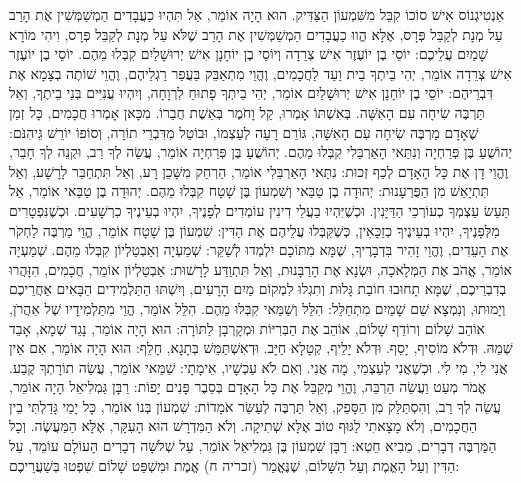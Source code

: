 אַנְטִיגְנוֹס אִישׁ סוֹכוֹ קִבֵּל מִשִּׁמְעוֹן הַצַּדִּיק. הוּא הָיָה אוֹמֵר, אַל תִּהְיוּ כַעֲבָדִים הַמְשַׁמְּשִׁין אֶת הָרַב עַל מְנָת לְקַבֵּל פְּרָס, אֶלָּא הֱווּ כַעֲבָדִים הַמְשַׁמְּשִׁין אֶת הָרַב שֶׁלֹּא עַל מְנָת לְקַבֵּל פְּרָס, וִיהִי מוֹרָא שָׁמַיִם עֲלֵיכֶם:
יוֹסֵי בֶן יוֹעֶזֶר אִישׁ צְרֵדָה וְיוֹסֵי בֶן יוֹחָנָן אִישׁ יְרוּשָׁלַיִם קִבְּלוּ מֵהֶם. יוֹסֵי בֶן יוֹעֶזֶר אִישׁ צְרֵדָה אוֹמֵר, יְהִי בֵיתְךָ בֵית וַעַד לַחֲכָמִים, וֶהֱוֵי מִתְאַבֵּק בַּעֲפַר רַגְלֵיהֶם, וֶהֱוֵי שׁוֹתֶה בְצָמָא אֶת דִּבְרֵיהֶם:
יוֹסֵי בֶן יוֹחָנָן אִישׁ יְרוּשָׁלַיִם אוֹמֵר, יְהִי בֵיתְךָ פָתוּחַ לִרְוָחָה, וְיִהְיוּ עֲנִיִּים בְּנֵי בֵיתֶךָ, וְאַל תַּרְבֶּה שִׂיחָה עִם הָאִשָּׁה. בְּאִשְׁתּוֹ אָמְרוּ, קַל וָחֹמֶר בְּאֵשֶׁת חֲבֵרוֹ. מִכָּאן אָמְרוּ חֲכָמִים, כָּל זְמַן שֶׁאָדָם מַרְבֶּה שִׂיחָה עִם הָאִשָּׁה, גּוֹרֵם רָעָה לְעַצְמוֹ, וּבוֹטֵל מִדִּבְרֵי תוֹרָה, וְסוֹפוֹ יוֹרֵשׁ גֵּיהִנֹּם:
יְהוֹשֻׁעַ בֶּן פְּרַחְיָה וְנִתַּאי הָאַרְבֵּלִי קִבְּלוּ מֵהֶם. יְהוֹשֻׁעַ בֶּן פְּרַחְיָה אוֹמֵר, עֲשֵׂה לְךָ רַב, וּקְנֵה לְךָ חָבֵר, וֶהֱוֵי דָן אֶת כָּל הָאָדָם לְכַף זְכוּת:
נִתַּאי הָאַרְבֵּלִי אוֹמֵר, הַרְחֵק מִשָּׁכֵן רָע, וְאַל תִּתְחַבֵּר לָרָשָׁע, וְאַל תִּתְיָאֵשׁ מִן הַפֻּרְעָנוּת:
יְהוּדָה בֶן טַבַּאי וְשִׁמְעוֹן בֶּן שָׁטָח קִבְּלוּ מֵהֶם. יְהוּדָה בֶן טַבַּאי אוֹמֵר, אַל תַּעַשׂ עַצְמְךָ כְעוֹרְכֵי הַדַּיָּנִין. וּכְשֶׁיִּהְיוּ בַעֲלֵי דִינִין עוֹמְדִים לְפָנֶיךָ, יִהְיוּ בְעֵינֶיךָ כִרְשָׁעִים. וּכְשֶׁנִּפְטָרִים מִלְּפָנֶיךָ, יִהְיוּ בְעֵינֶיךָ כְזַכָּאִין, כְּשֶׁקִּבְּלוּ עֲלֵיהֶם אֶת הַדִּין:
שִׁמְעוֹן בֶּן שָׁטָח אוֹמֵר, הֱוֵי מַרְבֶּה לַחְקֹר אֶת הָעֵדִים, וֶהֱוֵי זָהִיר בִּדְבָרֶיךָ, שֶׁמָּא מִתּוֹכָם יִלְמְדוּ לְשַׁקֵּר:
שְׁמַעְיָה וְאַבְטַלְיוֹן קִבְּלוּ מֵהֶם. שְׁמַעְיָה אוֹמֵר, אֱהֹב אֶת הַמְּלָאכָה, וּשְׂנָא אֶת הָרַבָּנוּת, וְאַל תִּתְוַדַּע לָרָשׁוּת:
אַבְטַלְיוֹן אוֹמֵר, חֲכָמִים, הִזָּהֲרוּ בְדִבְרֵיכֶם, שֶׁמָּא תָחוּבוּ חוֹבַת גָּלוּת וְתִגְלוּ לִמְקוֹם מַיִם הָרָעִים, וְיִשְׁתּוּ הַתַּלְמִידִים הַבָּאִים אַחֲרֵיכֶם וְיָמוּתוּ, וְנִמְצָא שֵׁם שָׁמַיִם מִתְחַלֵּל:
הִלֵּל וְשַׁמַּאי קִבְּלוּ מֵהֶם. הִלֵּל אוֹמֵר, הֱוֵי מִתַּלְמִידָיו שֶׁל אַהֲרֹן, אוֹהֵב שָׁלוֹם וְרוֹדֵף שָׁלוֹם, אוֹהֵב אֶת הַבְּרִיּוֹת וּמְקָרְבָן לַתּוֹרָה:
הוּא הָיָה אוֹמֵר, נָגֵד שְׁמָא, אָבֵד שְׁמֵהּ. וּדְלֹא מוֹסִיף, יָסֵף. וּדְלֹא יָלֵיף, קְטָלָא חַיָּב. וּדְאִשְׁתַּמֵּשׁ בְּתָגָא, חָלֵף:
הוּא הָיָה אוֹמֵר, אִם אֵין אֲנִי לִי, מִי לִי. וּכְשֶׁאֲנִי לְעַצְמִי, מָה אֲנִי. וְאִם לֹא עַכְשָׁיו, אֵימָתָי:
שַׁמַּאי אוֹמֵר, עֲשֵׂה תוֹרָתְךָ קֶבַע. אֱמֹר מְעַט וַעֲשֵׂה הַרְבֵּה, וֶהֱוֵי מְקַבֵּל אֶת כָּל הָאָדָם בְּסֵבֶר פָּנִים יָפוֹת:
רַבָּן גַּמְלִיאֵל הָיָה אוֹמֵר, עֲשֵׂה לְךָ רַב, וְהִסְתַּלֵּק מִן הַסָּפֵק, וְאַל תַּרְבֶּה לְעַשֵּׂר אֹמָדוֹת:
שִׁמְעוֹן בְּנוֹ אוֹמֵר, כָּל יָמַי גָּדַלְתִּי בֵין הַחֲכָמִים, וְלֹא מָצָאתִי לַגּוּף טוֹב אֶלָּא שְׁתִיקָה. וְלֹא הַמִּדְרָשׁ הוּא הָעִקָּר, אֶלָּא הַמַּעֲשֶׂה. וְכָל הַמַּרְבֶּה דְבָרִים, מֵבִיא חֵטְא:
רַבָּן שִׁמְעוֹן בֶּן גַּמְלִיאֵל אוֹמֵר, עַל שְׁלשָׁה דְבָרִים הָעוֹלָם עוֹמֵד, עַל הַדִּין וְעַל הָאֱמֶת וְעַל הַשָּׁלוֹם, שֶׁנֶּאֱמַר (זכריה ח) אֱמֶת וּמִשְׁפַּט שָׁלוֹם שִׁפְטוּ בְּשַׁעֲרֵיכֶם:

